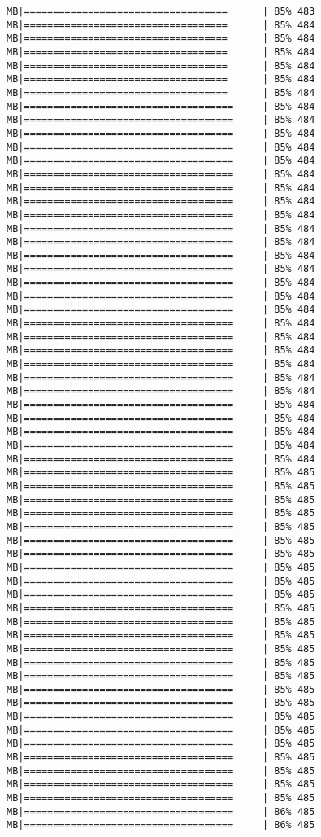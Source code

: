 \documentclass[
]{article}
\begin{document}
\begin{verbatim}
MB|===================================      | 85% 483 MB|===================================      | 85% 484 MB|===================================      | 85% 484 MB|===================================      | 85% 484 MB|===================================      | 85% 484 MB|===================================      | 85% 484 MB|===================================      | 85% 484 MB|====================================     | 85% 484 MB|====================================     | 85% 484 MB|====================================     | 85% 484 MB|====================================     | 85% 484 MB|====================================     | 85% 484 MB|====================================     | 85% 484 MB|====================================     | 85% 484 MB|====================================     | 85% 484 MB|====================================     | 85% 484 MB|====================================     | 85% 484 MB|====================================     | 85% 484 MB|====================================     | 85% 484 MB|====================================     | 85% 484 MB|====================================     | 85% 484 MB|====================================     | 85% 484 MB|====================================     | 85% 484 MB|====================================     | 85% 484 MB|====================================     | 85% 484 MB|====================================     | 85% 484 MB|====================================     | 85% 484 MB|====================================     | 85% 484 MB|====================================     | 85% 484 MB|====================================     | 85% 484 MB|====================================     | 85% 484 MB|====================================     | 85% 484 MB|====================================     | 85% 484 MB|====================================     | 85% 484 MB|====================================     | 85% 485 MB|====================================     | 85% 485 MB|====================================     | 85% 485 MB|====================================     | 85% 485 MB|====================================     | 85% 485 MB|====================================     | 85% 485 MB|====================================     | 85% 485 MB|====================================     | 85% 485 MB|====================================     | 85% 485 MB|====================================     | 85% 485 MB|====================================     | 85% 485 MB|====================================     | 85% 485 MB|====================================     | 85% 485 MB|====================================     | 85% 485 MB|====================================     | 85% 485 MB|====================================     | 85% 485 MB|====================================     | 85% 485 MB|====================================     | 85% 485 MB|====================================     | 85% 485 MB|====================================     | 85% 485 MB|====================================     | 85% 485 MB|====================================     | 85% 485 MB|====================================     | 85% 485 MB|====================================     | 85% 485 MB|====================================     | 85% 485 MB|====================================     | 86% 485 MB|====================================     | 86% 485 
\end{verbatim}
\end{document}
